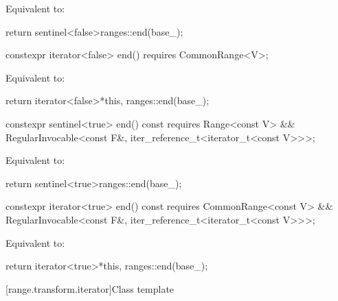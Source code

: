 \begin{itemdescr}
\pnum
\effects Equivalent to:
\begin{codeblock}
return sentinel<false>{ranges::end(base_)};
\end{codeblock}
\end{itemdescr}

%
\begin{itemdecl}
constexpr iterator<false> end() requires CommonRange<V>;
\end{itemdecl}

\begin{itemdescr}
\pnum
\effects Equivalent to:
\begin{codeblock}
return iterator<false>{*this, ranges::end(base_)};
\end{codeblock}
\end{itemdescr}

%
\begin{itemdecl}
constexpr sentinel<true> end() const
  requires Range<const V> &&
           RegularInvocable<const F&, iter_reference_t<iterator_t<const V>>>;
\end{itemdecl}

\begin{itemdescr}
\pnum
\effects Equivalent to:
\begin{codeblock}
return sentinel<true>{ranges::end(base_)};
\end{codeblock}
\end{itemdescr}

%
\begin{itemdecl}
constexpr iterator<true> end() const
  requires CommonRange<const V> &&
           RegularInvocable<const F&, iter_reference_t<iterator_t<const V>>>;
\end{itemdecl}

\begin{itemdescr}
\pnum
\effects Equivalent to:
\begin{codeblock}
return iterator<true>{*this, ranges::end(base_)};
\end{codeblock}
\end{itemdescr}

[range.transform.iterator]{Class template }


